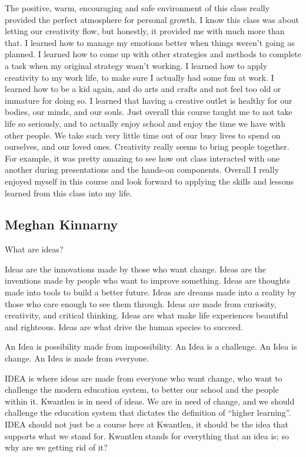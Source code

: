 \documentclass[letterpaper,10pt,headsepline]{scrreprt}
\begin{document}
The positive, warm, encouraging and safe environment of this class really provided the perfect atmosphere for personal growth. I know this class was about letting our creativity flow, but honestly, it provided me with much more than that. I learned how to manage my emotions better when things weren’t going as planned. I learned how to come up with other strategies and methods to complete a task when my original strategy wasn’t working. I learned how to apply creativity to my work life, to make sure I actually had some fun at work. I learned how to be a kid again, and do arts and crafts and not feel too old or immature for doing so. I learned that having a creative outlet is healthy for our bodies, our minds, and our souls. Just overall this course taught me to not take life so seriously, and to actually enjoy school and enjoy the time we have with other people. We take such very little time out of our busy lives to spend on ourselves, and our loved ones. Creativity really seems to bring people together. For example, it was pretty amazing to see how out class interacted with one another during presentations and the hands-on components. Overall I really enjoyed myself in this course and look forward to applying the skills and lessons learned from this class into my life. 

\subsection{Meghan Kinnarny}

What are ideas?

Ideas are the innovations made by those who want change. Ideas are the inventions made by people who want to improve something. Ideas are thoughts made into tools to build a better future. Ideas are dreams made into a reality by those who care enough to see them through. Ideas are made from curiosity, creativity, and critical thinking. Ideas are what make life experiences beautiful and righteous. Ideas are what drive the human species to succeed.

An Idea is possibility made from impossibility. An Idea is a challenge. An Idea is change. An Idea is made from everyone. 

IDEA is where ideas are made from everyone who want change, who want to challenge the modern education system, to better our school and the people within it. Kwantlen is in need of ideas. We are in need of change, and we should challenge the education system that dictates the definition of “higher learning”. IDEA should not just be a course here at Kwantlen, it should be the idea that supports what we stand for. Kwantlen stands for everything that an idea is; so why are we getting rid of it? 
\end{document}
